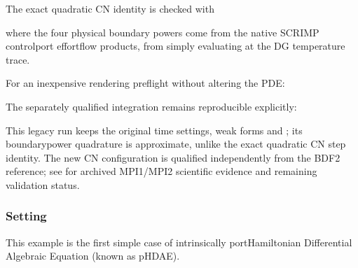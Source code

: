 \documentclass[letterpaper,10pt,english]{sphinxmanual}
\begin{document}
\sphinxAtStartPar
The exact quadratic CN identity is checked with

\begin{sphinxVerbatim}[commandchars=\\\{\}]
\end{sphinxVerbatim}

\sphinxAtStartPar
where the four physical boundary powers come from the native SCRIMP
control\sphinxhyphen{}port effort\textendash{}flow products,  from simply evaluating
 at the DG temperature trace.

\sphinxAtStartPar
For an inexpensive rendering preflight without altering the PDE:

\begin{sphinxVerbatim}[commandchars=\\\{\}]
\end{sphinxVerbatim}

\sphinxAtStartPar
The separately qualified  integration
remains reproducible explicitly:

\begin{sphinxVerbatim}[commandchars=\\\{\}]
\end{sphinxVerbatim}

\sphinxAtStartPar
This legacy run keeps the original time settings, weak forms and
; its boundary\sphinxhyphen{}power quadrature is
approximate, unlike the exact quadratic CN step identity. The new CN
configuration is qualified independently from the BDF2 reference;
see  for archived
MPI1/MPI2 scientific evidence and remaining validation status.


\subsubsection{Setting}
\label{\detokenize{examples/heat:setting}}
\sphinxAtStartPar
This example is the first simple case of intrinsically port\sphinxhyphen{}Hamiltonian
Differential Algebraic Equation (known as pH\sphinxhyphen{}DAE).
\end{document}
